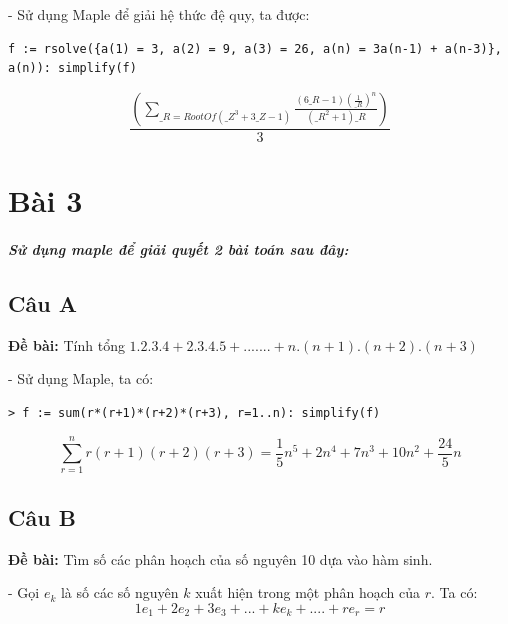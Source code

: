\documentclass[12pt]{article}
\begin{document}
\begin{sloppypar}
- Sử dụng Maple để giải hệ thức đệ quy, ta được:


\begin{lstlisting}[breaklines]
    f := rsolve({a(1) = 3, a(2) = 9, a(3) = 26, a(n) = 3a(n-1) + a(n-3)}, a(n)): simplify(f)
\end{lstlisting}

\begin{equation*}
    \frac{\left(\sum_{\_R = RootOf(\_Z^{3} + 3\_Z - 1)}\frac{(6\_R - 1)(\frac{1}{\_R})^{n}}{(\_R^{2} + 1)\_R}\right)}{3}
\end{equation*}

\section{Bài 3}
\subparagraph {Sử dụng maple để giải quyết 2 bài toán sau đây:}

\subsection{Câu A}
\begin{tcolorbox}
    \textbf{Đề bài:} Tính tổng \(1.2.3.4 + 2.3.4.5 + ....... + n.(n+1).(n+2).(n+3)\)
\end{tcolorbox}

- Sử dụng Maple, ta có:

\begin{verbatim}
> f := sum(r*(r+1)*(r+2)*(r+3), r=1..n): simplify(f)
\end{verbatim}

\begin{equation*}
    \sum_{r=1}^{n}r(r + 1)(r + 2)(r + 3) = \frac{1}{5}n^{5} + 2n^{4} + 7n^{3} + 10n^{2} + \frac{24}{5}n
\end{equation*}



\subsection{Câu B}
\begin{tcolorbox}
    \textbf{Đề bài:} Tìm số các phân hoạch của số nguyên 10 dựa vào hàm sinh.
\end{tcolorbox}

- Gọi \(e_{k}\) là số các số nguyên \(k\) xuất hiện trong một phân hoạch của \(r\). Ta có: \\
\begin{equation*}
    1e_{1} + 2e_{2} + 3e_{3} +...+ ke_{k} + ....+re_{r} = r
\end{equation*}


\end{sloppypar}
\end{document}
